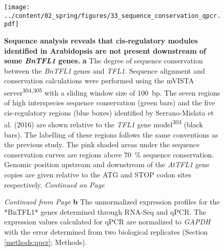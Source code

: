 \documentclass[12pt,]{book}
\begin{document}
\begin{figure}[htbp]
\centering
\texttt{[image: ../content/02\_spring/figures/33\_sequence\_conservation\_qpcr.pdf]}
\caption{\textbf{Sequence analysis reveals that cis-regulatory modules
identified in Arabidopsis are not present downstream of some
\emph{BnTFL1} genes.} \textbf{a} The degree of sequence conservation
between the \emph{BnTFL1} genes and \emph{TFL1}. Sequence alignment and
conservation calculations were performed using the mVISTA
server\textsuperscript{304,305} with a sliding window size of 100~bp.
The seven regions of high interspecies sequence conservation (green
bars) and the five cis-regulatory regions (blue boxes) identified by
Serrano-Mislata et al. (2016) are shown relative to the \emph{TFL1} gene
model\textsuperscript{303} (black bars). The labelling of these regions
follows the same conventions as the previous study. The pink shaded
areas under the sequence conservation curves are regions above 70~\%
sequence conservation. Genomic position upstream and downstream of the
\emph{AtTFL1} gene copies are given relative to the ATG and STOP codon
sites respectively. \emph{Continued on Page
\pageref{figure:233:tfl1conservationlegend}}}\label{figure:233:tfl1conservation}
\end{figure}

\addtocounter{figure}{-1}

\begin{figure} [t!]
\caption{\emph{Continued from Page \pageref{figure:233:tfl1conservation}} \textbf{b} The unnormalized expression profiles for the *BnTFL1* genes determined through RNA-Seq and qPCR. The expression values calculated for qPCR are normalized to \emph{GAPDH} with the error determined from two biological replicates (Section \ref{methods:qpcr}; Methods).}%
\label{figure:233:tfl1conservationlegend}
\end{figure}
\end{document}
